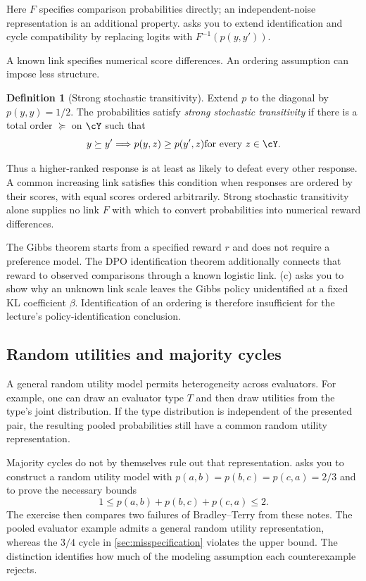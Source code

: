 \documentclass[11pt,twoside]{article}
\theoremstyle{definition}
\newtheorem{definition}[theorem]{Definition}
\theoremstyle{remark}
\begin{document}
Here $F$ specifies comparison probabilities
directly; an independent-noise representation is an additional property.
 asks you to extend identification and cycle
compatibility by replacing logits with $F^{-1}(p(y,y'))$.

A known link specifies numerical score differences. An ordering assumption
can impose less structure.

\begin{definition}[Strong stochastic transitivity]
\label{def:strong-stochastic-transitivity}
Extend $p$ to the diagonal by $p(y,y)=1/2$.
The probabilities satisfy \emph{strong stochastic transitivity} if there is a total
order $\succeq$ on $\cY$ such that
\[
 y\succeq y'\quad\Longrightarrow\quad
 p(y,z)\ge p(y',z)\quad\text{for every }z\in\cY.
\]
\end{definition}

Thus a higher-ranked response is at least as likely to defeat every other
response. A common increasing link satisfies this condition when responses
are ordered by their scores, with equal scores ordered arbitrarily. Strong
stochastic transitivity alone supplies no link $F$ with which to convert
probabilities into numerical reward differences.

The Gibbs theorem starts from a specified reward $r$ and does not require
a preference model. The DPO identification theorem additionally connects
that reward to observed comparisons through a known logistic link.
(c) asks you to show why an unknown link scale
leaves the Gibbs policy unidentified at a fixed KL coefficient $\beta$.
Identification of an ordering is therefore insufficient for the lecture's
policy-identification conclusion.

\subsection{Random utilities and majority cycles}

A general random utility model permits heterogeneity across evaluators.
For example, one can draw an evaluator type $T$ and then draw utilities
from the type's joint distribution. If the type distribution is independent
of the presented pair, the resulting pooled probabilities still have a
common random utility representation.

Majority cycles do not by themselves rule out that representation.
 asks you to construct a random utility
model with $p(a,b)=p(b,c)=p(c,a)=2/3$ and to prove the necessary bounds
\[
 1\le p(a,b)+p(b,c)+p(c,a)\le2.
\]
The exercise then compares two failures of Bradley--Terry from these notes.
The pooled evaluator example admits a general random utility representation,
whereas the $3/4$ cycle in \cref{sec:misspecification} violates the upper
bound. The distinction identifies how much of the modeling assumption
each counterexample rejects.
\end{document}
